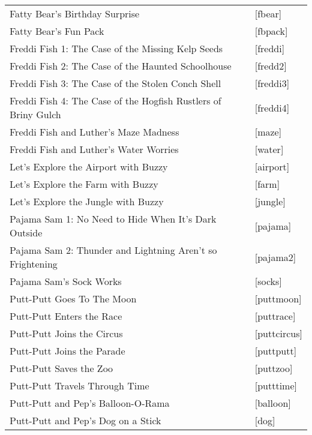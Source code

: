 \begin{itemize}
\begin{tabular}[h]{ll}
    Fatty Bear's Birthday Surprise&                                [fbear]\\
    Fatty Bear's Fun Pack&                                         [fbpack]\\
    Freddi Fish 1: The Case of the Missing Kelp Seeds&             [freddi]\\
    Freddi Fish 2: The Case of the Haunted Schoolhouse&            [fredd2]\\
    Freddi Fish 3: The Case of the Stolen Conch Shell&             [freddi3]\\
    Freddi Fish 4: The Case of the Hogfish Rustlers of Briny Gulch&[freddi4]\\
    Freddi Fish and Luther's Maze Madness&                         [maze]\\
    Freddi Fish and Luther's Water Worries&                        [water]\\
    Let's Explore the Airport with Buzzy&                          [airport]\\
    Let's Explore the Farm with Buzzy&                             [farm]\\
    Let's Explore the Jungle with Buzzy&                           [jungle]\\
    Pajama Sam 1: No Need to Hide When It's Dark Outside&          [pajama]\\
    Pajama Sam 2: Thunder and Lightning Aren't so Frightening&     [pajama2]\\
    Pajama Sam's Sock Works&                                       [socks]\\
    Putt-Putt Goes To The Moon&                                    [puttmoon]\\
    Putt-Putt Enters the Race&                                     [puttrace]\\
    Putt-Putt Joins the Circus&                                    [puttcircus]\\
    Putt-Putt Joins the Parade&                                    [puttputt]\\
    Putt-Putt Saves the Zoo&                                       [puttzoo]\\
    Putt-Putt Travels Through Time&                                [putttime]\\
    Putt-Putt and Pep's Balloon-O-Rama&                            [balloon]\\
    Putt-Putt and Pep's Dog on a Stick&                            [dog]\\

\end{tabular}
\end{itemize}
